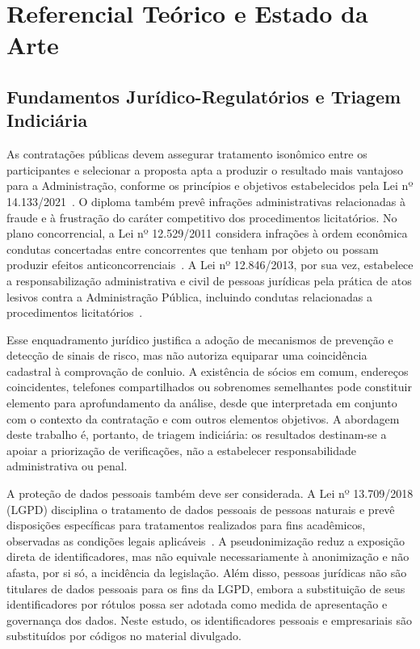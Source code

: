\section{Referencial Teórico e Estado da Arte}
\label{sec:referencial}

\subsection{Fundamentos Jurídico-Regulatórios e Triagem Indiciária}

As contratações públicas devem assegurar tratamento isonômico entre os participantes e selecionar a proposta apta a produzir o resultado mais vantajoso para a Administração, conforme os princípios e objetivos estabelecidos pela Lei nº 14.133/2021~\cite{brasil2021licitacoes}. O diploma também prevê infrações administrativas relacionadas à fraude e à frustração do caráter competitivo dos procedimentos licitatórios. No plano concorrencial, a Lei nº 12.529/2011 considera infrações à ordem econômica condutas concertadas entre concorrentes que tenham por objeto ou possam produzir efeitos anticoncorrenciais~\cite{brasil2011concorrencia}. A Lei nº 12.846/2013, por sua vez, estabelece a responsabilização administrativa e civil de pessoas jurídicas pela prática de atos lesivos contra a Administração Pública, incluindo condutas relacionadas a procedimentos licitatórios~\cite{brasil2013anticorrupcao}.

Esse enquadramento jurídico justifica a adoção de mecanismos de prevenção e detecção de sinais de risco, mas não autoriza equiparar uma coincidência cadastral à comprovação de conluio. A existência de sócios em comum, endereços coincidentes, telefones compartilhados ou sobrenomes semelhantes pode constituir elemento para aprofundamento da análise, desde que interpretada em conjunto com o contexto da contratação e com outros elementos objetivos. A abordagem deste trabalho é, portanto, de triagem indiciária: os resultados destinam-se a apoiar a priorização de verificações, não a estabelecer responsabilidade administrativa ou penal.

A proteção de dados pessoais também deve ser considerada. A Lei nº 13.709/2018 (LGPD) disciplina o tratamento de dados pessoais de pessoas naturais e prevê disposições específicas para tratamentos realizados para fins acadêmicos, observadas as condições legais aplicáveis~\cite{brasil2018lgpd}. A pseudonimização reduz a exposição direta de identificadores, mas não equivale necessariamente à anonimização e não afasta, por si só, a incidência da legislação. Além disso, pessoas jurídicas não são titulares de dados pessoais para os fins da LGPD, embora a substituição de seus identificadores por rótulos possa ser adotada como medida de apresentação e governança dos dados. Neste estudo, os identificadores pessoais e empresariais são substituídos por códigos no material divulgado.

